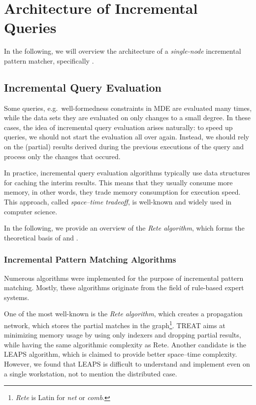 \section{Architecture of Incremental Queries}
\label{sec:architecture}

In the following, we will overview the architecture of a \emph{single-node} incremental pattern matcher, specifically \eiq{}.


\subsection{Incremental Query Evaluation}
\label{rete}

Some queries, e.g.\ well-formedness constraints in MDE are evaluated many times, while the data sets they are evaluated on only changes to a small degree. In these cases, the idea of incremental query evaluation arises naturally: to speed up queries, we should not start the evaluation all over again. Instead, we should rely on the (partial) results derived during the previous executions of the query and process only the changes that occured.
 
In practice, incremental query evaluation algorithms typically use data structures for caching the interim results. This  means that they usually consume more memory, in other words, they trade memory consumption for execution speed. This approach, called \emph{space--time tradeoff}, is well-known and widely used in computer science.

In the following, we provide an overview of the \emph{Rete algorithm}, which forms the theoretical basis of \eiq{} and \iqd{}.

\subsubsection{Incremental Pattern Matching Algorithms}

Numerous algorithms were implemented for the purpose of incremental pattern matching. Mostly, these algorithms originate from the field of rule-based expert systems.

One of the most well-known is the \emph{Rete algorithm}, which creates a propagation network, which stores the partial matches in the graph\footnote{\emph{Rete} is Latin for \emph{net} or \emph{comb}.}. TREAT \cite{Miranker:1991:OPT:627280.627434} aims at minimizing memory usage by using only indexers and dropping partial results, while having the same algorithmic complexity as Rete. Another candidate is the LEAPS \cite{Batory:1994:LA:899216} algorithm, which is claimed to provide better space--time complexity. However, we found that LEAPS is difficult to understand and implement even on a single workstation, not to mention the distributed case. 

